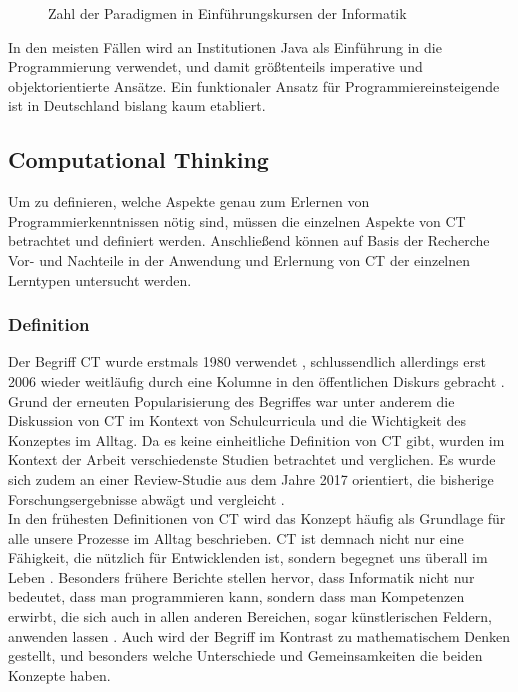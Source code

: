 \begin{figure}[H]
    \centering
    
    \caption{Zahl der Paradigmen in Einführungskursen der Informatik}
\end{figure}

In den meisten Fällen wird an Institutionen Java als Einführung in die Programmierung verwendet, und damit größtenteils imperative und objektorientierte Ansätze.
Ein funktionaler Ansatz für Programmiereinsteigende ist in Deutschland bislang kaum etabliert.

\subsection{Computational Thinking}
Um zu definieren, welche Aspekte genau zum Erlernen von Programmierkenntnissen nötig sind, müssen die einzelnen Aspekte von CT betrachtet und definiert werden. Anschließend können auf Basis der Recherche Vor- und Nachteile in der Anwendung und Erlernung von CT der einzelnen Lerntypen untersucht werden.

\subsubsection{Definition}
Der Begriff CT wurde erstmals 1980 verwendet \cite{papert}, schlussendlich allerdings erst 2006 wieder weitläufig durch eine Kolumne in den öffentlichen Diskurs gebracht \cite{wing2006}.
Grund der erneuten Popularisierung des Begriffes war unter anderem die Diskussion von CT im Kontext von Schulcurricula und die Wichtigkeit des Konzeptes im Alltag.
Da es keine einheitliche Definition von CT gibt, wurden im Kontext der Arbeit verschiedenste Studien betrachtet und verglichen. Es wurde sich zudem an einer Review-Studie aus dem Jahre 2017 orientiert, die bisherige Forschungsergebnisse abwägt und vergleicht \cite{schute}.
\\
In den frühesten Definitionen von CT wird das Konzept häufig als Grundlage für alle unsere Prozesse im Alltag beschrieben. CT ist demnach nicht nur eine Fähigkeit, die nützlich für Entwicklenden ist, sondern begegnet uns überall im Leben \cite{khine17}. Besonders frühere Berichte stellen hervor, dass Informatik nicht nur bedeutet, dass man programmieren kann, sondern dass man Kompetenzen erwirbt, die sich auch in allen anderen Bereichen, sogar künstlerischen Feldern, anwenden lassen \cite{wing2006}.
Auch wird der Begriff im Kontrast zu mathematischem Denken gestellt, und besonders welche Unterschiede und Gemeinsamkeiten die beiden Konzepte haben.

